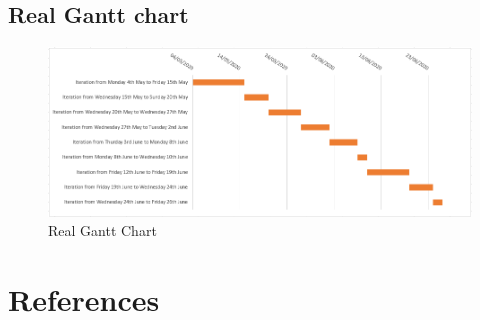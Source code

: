 \documentclass[a4paper, 12pt]{article}
\begin{document}
\begin{appendix}
    \section{Real Gantt chart}
    \begin{figure}[h]
        \centering
        \includegraphics[scale = 0.6]{images/gantt.png}
        \caption{Real Gantt Chart}
    \end{figure}
\end{appendix}

\newpage
\section{References}
\nocite{*}
\printbibliography[heading=subbibintoc,type=article,title={Bibliography}]
\printbibliography[heading=subbibintoc,type=misc,title={Webography}]
\end{document}

